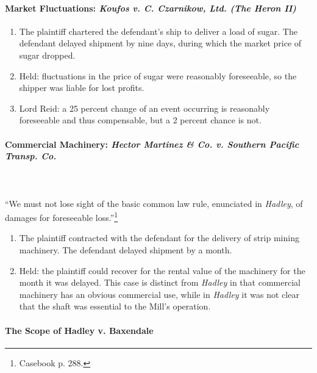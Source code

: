 \paragraph{Market Fluctuations: \emph{Koufos v. C. Czarnikow, Ltd. (The Heron 
II)}}

\begin{enumerate}
    \item The plaintiff chartered the defendant's ship to deliver a load of 
    sugar. The defendant delayed shipment by nine days, during which the 
    market price of sugar dropped.
    \item Held: fluctuations in the price of sugar were reasonably 
    foreseeable, so the shipper was liable for lost profits.
    \item Lord Reid: a 25 percent change of an event occurring is reasonably 
    foreseeable and thus compensable, but a 2 percent chance is not.
\end{enumerate}

\paragraph{Commercial Machinery: \emph{Hector Martinez \& Co. v. Southern 
Pacific Transp. Co.}}
~\\\\
``We must not lose sight of the basic common law rule, enunciated in 
\emph{Hadley}, of damages for foreseeable loss.''\footnote{Casebook p. 288.}

\begin{enumerate}
    \item The plaintiff contracted with the defendant for the delivery of 
    strip mining machinery. The defendant delayed shipment by a month.
    \item Held: the plaintiff could recover for the rental value of the 
    machinery for the month it was delayed. This case is distinct from 
    \emph{Hadley} in that commercial machinery has an obvious commercial use, 
    while in \emph{Hadley} it was not clear that the shaft was essential to 
    the Mill's operation.
\end{enumerate}

\paragraph{The Scope of Hadley v. Baxendale}

